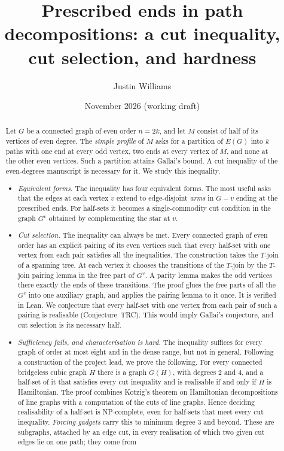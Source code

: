 \documentclass[11pt]{amsart}
\title[Prescribed ends in path decompositions]{Prescribed ends in path decompositions: a cut inequality, cut selection, and hardness}
\author{Justin Williams}
\date{November 2026 (working draft)}
\theoremstyle{definition}
\begin{document}
\begin{abstract}
Let $G$ be a connected graph of even order $n=2k$, and let $M$ consist of half of its vertices of even
degree. The \emph{simple profile} of $M$ asks for a partition of $E(G)$ into $k$ paths with one end at
every odd vertex, two ends at every vertex of $M$, and none at the other even vertices. Such a
partition attains Gallai's bound. A cut inequality of the even-degrees manuscript is necessary for
it. We study this inequality.
\begin{itemize}
\item \emph{Equivalent forms.} The inequality has four equivalent forms. The most useful asks that
the edges at each vertex $v$ extend to edge-disjoint \emph{arms} in $G-v$ ending at the prescribed
ends. For half-sets it becomes a single-commodity cut condition in the graph $G^v$ obtained by
complementing the star at $v$.
\item \emph{Cut selection.} The inequality can always be met. Every connected graph of even order has
an explicit pairing of its even vertices such that every half-set with one vertex from each pair
satisfies all the inequalities. The construction takes the $T$-join of a spanning tree. At each
vertex it chooses the transitions of the $T$-join by the $T$-join pairing lemma in the free part of
$G^v$. A parity lemma makes the odd vertices there exactly the ends of these transitions. The proof
glues the free parts of all the $G^v$ into one auxiliary graph, and applies the pairing lemma to it
once. It is verified in Lean. We
conjecture that every half-set with one vertex from each pair of such a pairing is realisable
(Conjecture~TRC). This would imply Gallai's conjecture, and cut selection is its necessary half.
\item \emph{Sufficiency fails, and characterisation is hard.} The inequality suffices for every graph
of order at most eight and in the dense range, but not in general. Following a construction of the
project lead, we prove the following. For every connected bridgeless cubic graph $H$ there is a graph
$G(H)$, with degrees $2$ and $4$, and a half-set of it that satisfies every cut inequality and is
realisable if and only if $H$ is Hamiltonian. The proof combines Kotzig's theorem on Hamiltonian
decompositions of line graphs with a computation of the cuts of line graphs. Hence deciding
realisability of a half-set is NP-complete, even for half-sets that meet every cut inequality.
\emph{Forcing gadgets} carry this to minimum degree $3$ and beyond. These are subgraphs, attached by
an edge cut, in every realisation of which two given cut edges lie on one path; they come from

\end{itemize}
\end{abstract}
\end{document}
